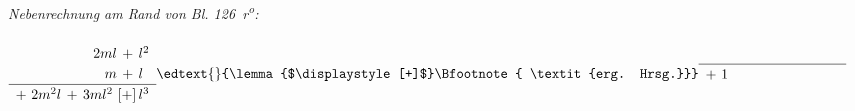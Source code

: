 \\
\textit{Nebenrechnung am Rand von Bl. 126~r\textsuperscript{o}:}\\
\\
$\displaystyle \renewcommand{\arraystretch}{1.2} \begin{array}{r} 2ml \, + \, l^2 \\
\ m \, + \, l^{\phantom{2}} \\
\hline + \ 2m^2l \, + \, 3ml^2 \ [+] \, l^3 \end{array}\edtext{}{\lemma{$\displaystyle [+]$}\Bfootnote{ \textit{erg. Hrsg.}}} \\
\renewcommand{\arraystretch}{1.2} \begin{array}{r} \hline + \ 1\phantom{\ m^2l \, + \, 3ml^2 \, [+] l^3} \end{array}$
\pend